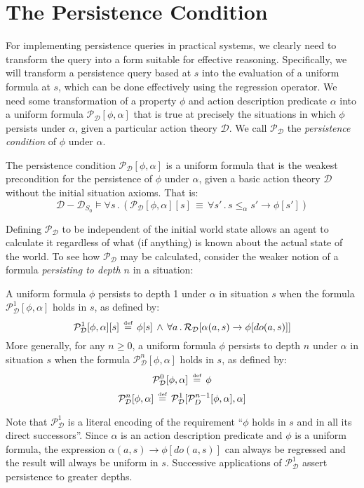 \section{The Persistence Condition}

For implementing persistence queries in practical systems, we clearly
need to transform the query into a form suitable for effective reasoning.
Specifically, we will transform a persistence query based at $s$
into the evaluation of a uniform formula at $s$, which can be done
effectively using the regression operator. We need some transformation
of a property $\phi$ and action description predicate $\alpha$ into
a uniform formula $\mathcal{P}_{\mathcal{D}}[\phi,\alpha]$ that is
true at precisely the situations in which $\phi$ persists under $\alpha$,
given a particular action theory $\mathcal{D}$. We call $\mathcal{P}_{\mathcal{D}}$
the \emph{persistence condition} of $\phi$ under $\alpha$.

\begin{defn}
The persistence condition $\mathcal{P}_{\mathcal{D}}[\phi,\alpha]$
is a uniform formula that is the weakest precondition for the persistence
of $\phi$ under $\alpha$, given a basic action theory $\mathcal{D}$
without the initial situation axioms. That is:\label{def:persistence-condition}\[
\mathcal{D}-\mathcal{D}_{S_{0}}\models\forall s\,.\,\left(\mathcal{P_{D}}[\phi,\alpha][s]\,\equiv\,\forall s'\,.\, s\leq_{\alpha}s'\rightarrow\phi[s']\right)\]

\end{defn}
Defining $\mathcal{P}_{\mathcal{D}}$ to be independent of the initial
world state allows an agent to calculate it regardless of what (if
anything) is known about the actual state of the world. To see how
$\mathcal{P}_{\mathcal{D}}$ may be calculated, consider the weaker
notion of a formula \emph{persisting to depth $n$} in a situation:

\begin{defn}
A uniform formula $\phi$ persists to depth 1 under $\alpha$ in situation
$s$ when the formula $\mathcal{P}_{\mathcal{D}}^{1}[\phi,\alpha]$
holds in $s$, as defined by:\label{def:persists-depth-n}\[
\mathcal{P}_{\mathcal{D}}^{1}[\phi,\alpha][s]\,\stackrel{\mbox{\tiny def}}{=}\,\phi[s]\,\wedge\,\forall a\,.\,\mathcal{R_{D}}[\alpha(a,s)\rightarrow\phi[do(a,s)]]\]
More generally, for any $n\geq0$, a uniform formula $\phi$ persists
to depth $n$ under $\alpha$ in situation $s$ when the formula $\mathcal{P}_{\mathcal{D}}^{n}[\phi,\alpha]$
holds in $s$, as defined by:\[
\mathcal{P}_{\mathcal{D}}^{0}[\phi,\alpha]\,\stackrel{\mbox{\tiny def}}{=}\,\phi\]
\[
\mathcal{P}_{\mathcal{D}}^{n}[\phi,\alpha]\,\stackrel{\mbox{\tiny def}}{=}\,\mathcal{P}_{\mathcal{D}}^{1}[\mathcal{P}_{D}^{n-1}[\phi,\alpha],\alpha]\]



\end{defn}
Note that $\mathcal{P}_{\mathcal{D}}^{1}$ is a literal encoding of
the requirement {}``$\phi$ holds in $s$ and in all its direct successors''.
Since $\alpha$ is an action description predicate and $\phi$ is
a uniform formula, the expression $\alpha(a,s)\rightarrow\phi[do(a,s)]$
can always be regressed and the result will always be uniform in $s$.
Successive applications of $\mathcal{P}_{\mathcal{D}}^{1}$ assert
persistence to greater depths.

